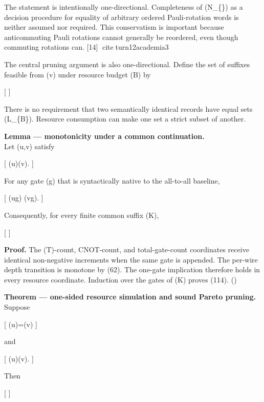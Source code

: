 \documentclass[
]{article}
\begin{document}
The statement is intentionally one-directional. Completeness of
(\mathcal N\_\{\}) as a decision procedure for equality of
arbitrary ordered Pauli-rotation words is neither assumed nor required.
This conservatism is important because anticommuting Pauli rotations
cannot generally be reordered, even though commuting rotations can.
{[}14{]} citeturn12academia3

The central pruning argument is also one-directional. Define the set of
suffixes feasible from (v) under resource budget (\mathbf B) by

{[}   {]}

There is no requirement that two semantically identical records have
equal sets (\mathcal L\_\{\mathbf B\}). Resource consumption can make
one set a strict subset of another.

\textbf{Lemma --- monotonicity under a common continuation.}\\
Let (u,v) satisfy

{[} \boldsymbol\rho(u)\preceq\boldsymbol\rho(v).  {]}

For any gate (g) that is syntactically native to the all-to-all
baseline,

{[} \boldsymbol\rho(u\oplus g) \preceq \boldsymbol\rho(v\oplus g).
 {]}

Consequently, for every finite common suffix (K),

{[}   {]}

\textbf{Proof.} The (T)-count, CNOT-count, and total-gate-count
coordinates receive identical non-negative increments when the same gate
is appended. The per-wire depth transition is monotone by (62). The
one-gate implication therefore holds in every resource coordinate.
Induction over the gates of (K) proves (114). (\square)

\textbf{Theorem --- one-sided resource simulation and sound Pareto
pruning.}\\
Suppose

{[} \kappa(u)=\kappa(v)  {]}

and

{[} \boldsymbol\rho(u)\preceq\boldsymbol\rho(v).  {]}

Then

{[}   {]}
\end{document}
